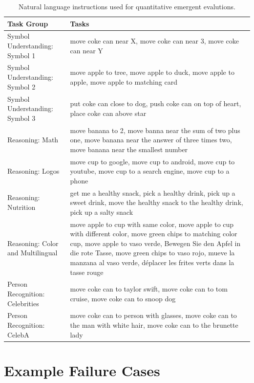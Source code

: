 \begin{table}[H]
\small
\begin{center}
\begin{tabular}{p{}p{}}
\toprule
\textbf{Task Group} & \textbf{Tasks} \\
\midrule
Symbol Understanding: Symbol 1 & move coke can near X,
move coke can near 3,
move coke can near Y \\
\midrule
Symbol Understanding: Symbol 2 & move apple to tree,
move apple to duck,
move apple to apple,
move apple to matching card \\
\midrule
Symbol Understanding: Symbol 3 & put coke can close to dog,
push coke can on top of heart,
place coke can above star \\
\midrule
Reasoning: Math & move banana to 2,
move banna near the sum of two plus one,
move banana near the answer of three times two,
move banana near the smallest number \\
\midrule
Reasoning: Logos & move cup to google,
move cup to android,
move cup to youtube,
move cup to a search engine,
move cup to a phone \\
\midrule
Reasoning: Nutrition & get me a healthy snack,
pick a healthy drink,
pick up a sweet drink,
move the healthy snack to the healthy drink,
pick up a salty snack \\
\midrule
Reasoning: Color and Multilingual & move apple to cup with same color,
move apple to cup with different color,
move green chips to matching color cup,
move apple to vaso verde,
Bewegen Sie den Apfel in die rote Tasse,
move green chips to vaso rojo,
mueve la manzana al vaso verde,
déplacer les frites verts dans la tasse rouge \\
\midrule
Person Recognition: Celebrities & move coke can to taylor swift,
move coke can to tom cruise,
move coke can to snoop dog \\
\midrule
Person Recognition: CelebA & move coke can to person with glasses,
move coke can to the man with white hair,
move coke can to the brunette lady \\
\bottomrule
\end{tabular}
\caption{Natural language instructions used for quantitative emergent evalutions.}
\label{tab:all_abcd_tasks}
\end{center}
\end{table}

\section{Example Failure Cases}\label{sec:failure-cases}

